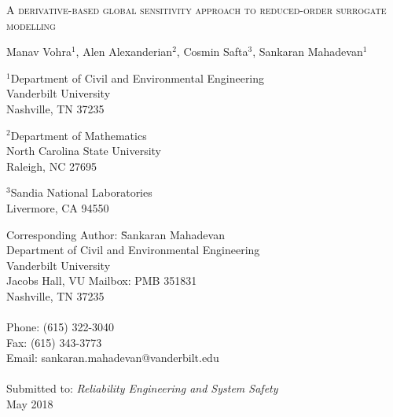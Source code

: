\begin{center}
\textsc{
A derivative-based global sensitivity approach to reduced-order surrogate modelling
}

\bigskip 
\bigskip 

Manav Vohra$^{1}$, Alen Alexanderian$^{2}$, Cosmin Safta$^{3}$, Sankaran Mahadevan$^{1}$

\bigskip
\bigskip

\normalsize
$^1$Department of Civil and Environmental Engineering\\
Vanderbilt University\\
Nashville, TN 37235\\

\bigskip

$^2$Department of Mathematics\\
North Carolina State University\\
Raleigh, NC 27695\\

\bigskip

$^3$Sandia National Laboratories\\
Livermore, CA 94550\\

\end{center}

\vspace{6cm}

\begin{tabbing}
Corresponding Author: \hspace{5mm} \= Sankaran Mahadevan\\
       \>  Department of Civil and Environmental Engineering\\
       \>  Vanderbilt University\\
        Jacobs Hall, VU Mailbox: PMB 351831 \\
       \>  Nashville, TN 37235 \\
       \> \\
Phone: \> (615) 322-3040 \\
Fax:   \> (615) 343-3773 \\
Email: \>  sankaran.mahadevan@vanderbilt.edu   \\
\\
Submitted to: \> \textit{Reliability Engineering and System Safety} \\
\>  May 2018\\

\bigskip
\end{tabbing}

\clearpage

